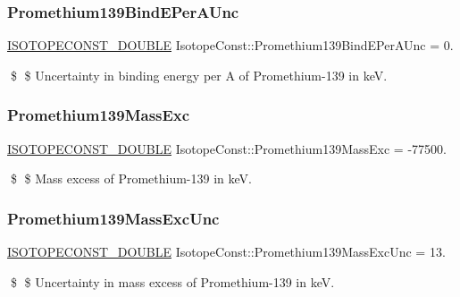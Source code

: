 \subsubsection{\texorpdfstring{Promethium139\+Bind\+E\+Per\+A\+Unc}{Promethium139BindEPerAUnc}}
{\footnotesize\ttfamily \mbox{\hyperlink{group___isotope_const-_macros_ga8f45a7272ce02c0b4c65c44636ed719a}{I\+S\+O\+T\+O\+P\+E\+C\+O\+N\+S\+T\+\_\+\+D\+O\+U\+B\+LE}} Isotope\+Const\+::\+Promethium139\+Bind\+E\+Per\+A\+Unc = 0.}

\$ \$ Uncertainty in binding energy per A of Promethium-\/139 in keV. \mbox{\label{group___isotope_const-_promethium-_pm139_ga41bf00a8a4cbdc52410307c23c380372}} 
\subsubsection{\texorpdfstring{Promethium139\+Mass\+Exc}{Promethium139MassExc}}
{\footnotesize\ttfamily \mbox{\hyperlink{group___isotope_const-_macros_ga8f45a7272ce02c0b4c65c44636ed719a}{I\+S\+O\+T\+O\+P\+E\+C\+O\+N\+S\+T\+\_\+\+D\+O\+U\+B\+LE}} Isotope\+Const\+::\+Promethium139\+Mass\+Exc = -\/77500.}

\$ \$ Mass excess of Promethium-\/139 in keV. \mbox{\label{group___isotope_const-_promethium-_pm139_ga01009bc8539823575fe67d4f36a90117}} 
\subsubsection{\texorpdfstring{Promethium139\+Mass\+Exc\+Unc}{Promethium139MassExcUnc}}
{\footnotesize\ttfamily \mbox{\hyperlink{group___isotope_const-_macros_ga8f45a7272ce02c0b4c65c44636ed719a}{I\+S\+O\+T\+O\+P\+E\+C\+O\+N\+S\+T\+\_\+\+D\+O\+U\+B\+LE}} Isotope\+Const\+::\+Promethium139\+Mass\+Exc\+Unc = 13.}

\$ \$ Uncertainty in mass excess of Promethium-\/139 in keV. \mbox{\label{group___isotope_const-_promethium-_pm139_ga6f6941b4905c6a5166a3ea8a9bbcf442}} 
